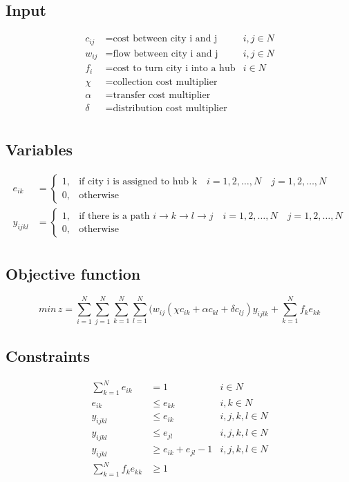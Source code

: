 \documentclass{article}
\begin{document}
\subsection*{Input}
\begin{align*}
c_{ij} &= \text{cost between city i and j}  &i,j \in N\\
w_{ij} &= \text{flow between city i and j} &i,j \in N\\
f_{i} &= \text{cost to turn city i into a hub} &i \in N\\
\chi &= \text{collection cost multiplier} \\
\alpha &= \text{transfer cost multiplier} \\
\delta &= \text{distribution cost multiplier} \\
\end{align*}

\subsection*{Variables}
\begin{align*}
e_{ik} &=
\begin{cases} 
1, & \text{if city i is assigned to hub k} \quad i=1,2,\ldots,N \quad j=1,2,\ldots,N  \\ 
0, & \text{otherwise} 
\end{cases} \\
y_{ijkl} &=
\begin{cases} 
1, & \text{if there is a path } i \rightarrow k \rightarrow l \rightarrow j \quad i=1,2,\ldots,N \quad j=1,2,\ldots,N  \\ 
0, & \text{otherwise} 
\end{cases} \\
\end{align*}

\subsection*{Objective function}
$$min\,z=\sum^N_{i=1}\sum^N_{j=1}\sum^N_{k=1}\sum^N_{l=1}(w_{ij}(\chi c_{ik}+\alpha c_{kl}+\delta c_{lj})y_{ijlk} + \sum^N_{k=1}f_{k}e_{kk}$$

\subsection*{Constraints}
\begin{align*}
\sum^N_{k=1}e_{ik} &= 1 &i \in N \\
e_{ik} & \leq e_{kk} &i,k \in N \\
y_{ijkl} &\leq e_{ik} &i,j,k,l \in N \\
y_{ijkl} &\leq e_{jl} &i,j,k,l \in N \\
y_{ijkl} &\geq e_{ik} + e_{jl} - 1 &i,j,k,l \in N \\
\sum^N_{k=1}f_k e_{kk} &\geq 1
\end{align*}
\end{document}
